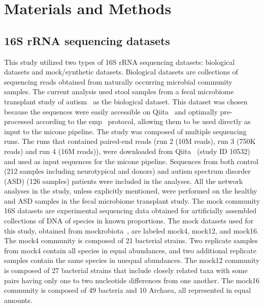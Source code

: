 
\section*{Materials and Methods}

  \subsection*{16S rRNA sequencing datasets}
  \vspace{-5mm}
  This study utilized two types of 16S rRNA sequencing datasets: biological datasets and mock/synthetic datasets.
  Biological datasets are collections of sequencing reads obtained from naturally occurring microbial community samples.
  The current analysis used stool samples from a fecal microbiome transplant study of autism~\cite{Kang2017} as the biological dataset.
  This dataset was chosen because the sequences were easily accessible on Qiita~\cite{qiita} and optimally pre-processed according to the \ac{emp}~\cite{Thompson2017} protocol, allowing them to be used directly as input to the \ac{micone} pipeline.
  The study was composed of multiple sequencing runs.
  The runs that contained paired-end reads (run 2 (10M reads), run 3 (750K reads) and run 4 (16M reads)), were downloaded from Qiita~\cite{qiita} (study ID 10532) and used as input sequences for the \ac{micone} pipeline.
  Sequences from both control (212 samples including neurotypical and donors) and autism spectrum disorder (ASD) (126 samples) patients were included in the analyses.
  All the network analyses in the study, unless explicitly mentioned, were performed on the healthy and ASD samples in the fecal microbiome transplant study.
  The mock community 16S datasets are experimental sequencing data obtained for artificially assembled collections of DNA of species in known proportions.
  The mock datasets used for this study, obtained from mockrobiota~\cite{Bokulich2016}, are labeled mock4, mock12, and mock16.
  The mock4 community is composed of 21 bacterial strains.
  Two replicate samples from mock4 contain all species in equal abundances, and two additional replicate samples contain the same species in unequal abundances.
  The mock12 community is composed of 27 bacterial strains that include closely related taxa with some pairs having only one to two nucleotide differences from one another.
  The mock16 community is composed of 49 bacteria and 10 Archaea, all represented in equal amounts.

